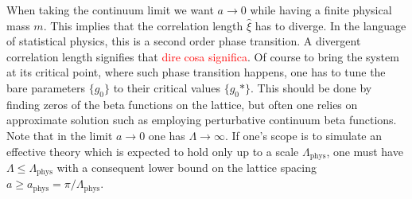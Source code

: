 When taking the continuum limit we want $a \to 0$ while having a finite physical mass $m$. This implies that the correlation length $\hat \xi$ has to diverge. In the language of statistical physics, this is a second order phase transition. A divergent correlation length signifies that \textcolor{red}{dire cosa significa}. Of course to bring the system at its critical point, where such phase transition happens, one has to tune the bare parameters $\{g_0\}$ to their critical values $\{g_0*\}$. 
This should be done by finding zeros of the beta functions on the lattice, but often one relies on approximate solution such as employing perturbative continuum beta functions. \\
Note that in the limit $a \to 0$ one has $\Lambda \to \infty$. If one's scope is to simulate an effective theory which is expected to hold only up to a scale $\Lambda_\text{phys}$, one must have $\Lambda \leq \Lambda_\text{phys}$ with a consequent lower bound on the lattice spacing $a \geq a_\text{phys} = \pi / \Lambda_\text{phys}$. \\ ~
